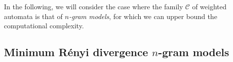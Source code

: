 \documentclass{article}
\newcommand{\cC}{\mathcal C}
\newcommand{\set}[2][]{#1 \{ #2 #1 \} }
\begin{document}
In the following, we will consider the case where the family $\cC$ of
weighted automata is that of \emph{$n$-gram models}, for which we can
upper bound the computational complexity.


\subsection{Minimum R\'{e}nyi divergence $n$-gram models}
\label{sec:min-Renyi}


\end{document}
